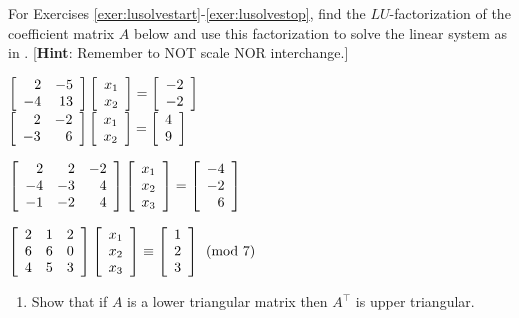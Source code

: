\noindent For Exercises \ref{exer:lusolvestart}-\ref{exer:lusolvestop}, find the $LU$-factorization of the coefficient matrix $A$ below and use this factorization to solve the linear system as in . [\textbf{Hint}: Remember to NOT scale NOR interchange.]
\begin{enumerate}[!HW!, label=$\spadesuit$ \arabic*., ref=\arabic*]
\begin{multicols}{2}
\item\label{exer:lusolvestart} $\mtx{rr}{2&-5\\-4&13}\vr{x_1\\x_2} = \vr{-2\\-2}$\\ 
\itemspade $\mtx{rr}{2&-2\\-3&6}\vr{x_1\\x_2} = \vr{4\\9}$ 
\end{multicols}
\begin{multicols}{2}
\itemspade $\mtx{rrr}{2&2&-2\\-4&-3&4\\-1&-2&4}\vr{x_1\\x_2\\x_3} = \vr{-4\\-2\\6}$
\item\label{exer:lusolvestop} $\mtx{rrr}{2&1&2\\6&6&0\\4&5&3}\vr{x_1\\x_2\\x_3} \equiv \vr{1\\2\\3} \pmod 7$
\end{multicols}
\end{enumerate}

\begin{enumerate}[!HW!]
\item Show that if $A$ is a lower triangular matrix then $A^\top $ is upper triangular.\\ %
\end{enumerate}

 \mbox{}\vfill
\pagebreak